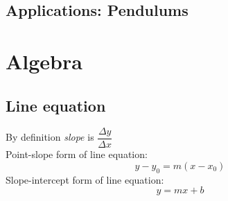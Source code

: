 \documentclass[12pt, a4paper]{scrartcl}
\begin{document}
\subsection{Applications: Pendulums}
\label{sec:application:pendulums}

\newpage

\appendix

\section{Algebra}
\label{appendix:algebra}

\subsection{Line equation}
\label{appendix:algebra:line_equation}

By definition \textit{slope} is $\dfrac{\Delta y}{\Delta x}$\\
Point-slope form of line equation: $$y - y_0 = m (x - x_0)$$
Slope-intercept form of line equation: $$y = mx + b$$
\end{document}
